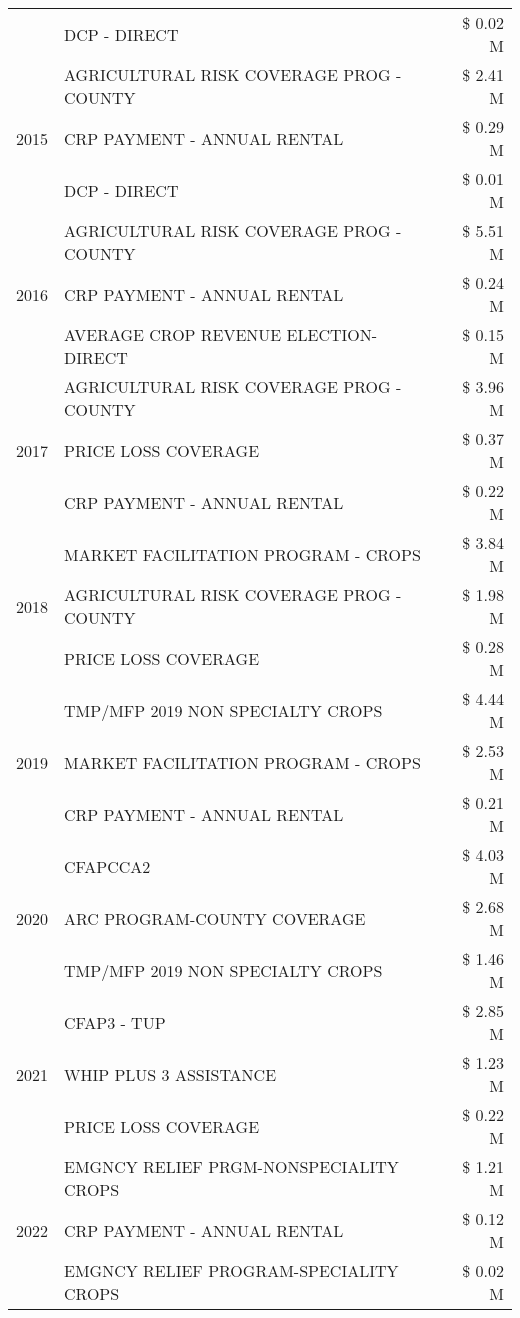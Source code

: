 \begin{tabular}{llr}
 & DCP - DIRECT & \$ 0.02 M \\
\cline{1-3}
\multirow[t]{3}{*}{2015} & AGRICULTURAL RISK COVERAGE PROG - COUNTY & \$ 2.41 M \\
 & CRP PAYMENT - ANNUAL RENTAL & \$ 0.29 M \\
 & DCP - DIRECT & \$ 0.01 M \\
\cline{1-3}
\multirow[t]{3}{*}{2016} & AGRICULTURAL RISK COVERAGE PROG - COUNTY & \$ 5.51 M \\
 & CRP PAYMENT - ANNUAL RENTAL & \$ 0.24 M \\
 & AVERAGE CROP REVENUE ELECTION-DIRECT & \$ 0.15 M \\
\cline{1-3}
\multirow[t]{3}{*}{2017} & AGRICULTURAL RISK COVERAGE PROG - COUNTY & \$ 3.96 M \\
 & PRICE LOSS COVERAGE & \$ 0.37 M \\
 & CRP PAYMENT - ANNUAL RENTAL & \$ 0.22 M \\
\cline{1-3}
\multirow[t]{3}{*}{2018} & MARKET FACILITATION PROGRAM - CROPS & \$ 3.84 M \\
 & AGRICULTURAL RISK COVERAGE PROG - COUNTY & \$ 1.98 M \\
 & PRICE LOSS COVERAGE & \$ 0.28 M \\
\cline{1-3}
\multirow[t]{3}{*}{2019} & TMP/MFP 2019 NON SPECIALTY CROPS & \$ 4.44 M \\
 & MARKET FACILITATION PROGRAM - CROPS & \$ 2.53 M \\
 & CRP PAYMENT - ANNUAL RENTAL & \$ 0.21 M \\
\cline{1-3}
\multirow[t]{3}{*}{2020} & CFAPCCA2 & \$ 4.03 M \\
 & ARC PROGRAM-COUNTY COVERAGE & \$ 2.68 M \\
 & TMP/MFP 2019 NON SPECIALTY CROPS & \$ 1.46 M \\
\cline{1-3}
\multirow[t]{3}{*}{2021} & CFAP3 - TUP & \$ 2.85 M \\
 & WHIP PLUS 3 ASSISTANCE & \$ 1.23 M \\
 & PRICE LOSS COVERAGE & \$ 0.22 M \\
\cline{1-3}
\multirow[t]{3}{*}{2022} & EMGNCY RELIEF PRGM-NONSPECIALITY CROPS & \$ 1.21 M \\
 & CRP PAYMENT - ANNUAL RENTAL & \$ 0.12 M \\
 & EMGNCY RELIEF PROGRAM-SPECIALITY CROPS & \$ 0.02 M \\
\cline{1-3}
\bottomrule
\end{tabular}
